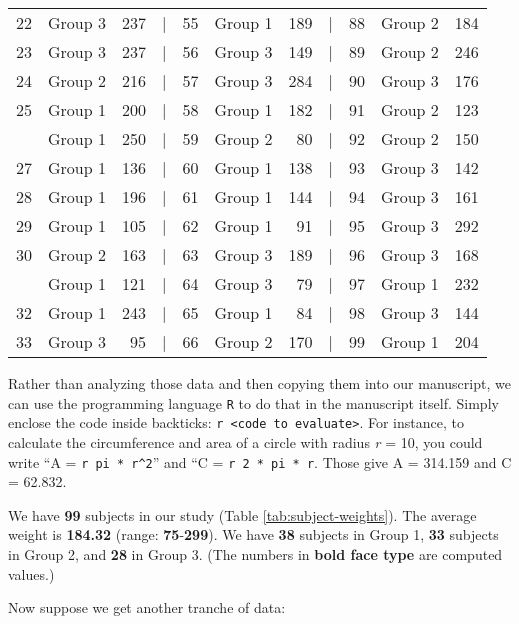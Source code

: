 \documentclass[smallextended]{svjour3}       %
\begin{document}
\begin{table}
\begin{tabular}[t]{rlrlrlrlrlr}
22 & Group 3 & 237 & | & 55 & Group 1 & 189 & | & 88 & Group 2 & 184\\
23 & Group 3 & 237 & | & 56 & Group 3 & 149 & | & 89 & Group 2 & 246\\
24 & Group 2 & 216 & | & 57 & Group 3 & 284 & | & 90 & Group 3 & 176\\
25 & Group 1 & 200 & | & 58 & Group 1 & 182 & | & 91 & Group 2 & 123\\
\addlinespace
26 & Group 1 & 250 & | & 59 & Group 2 & 80 & | & 92 & Group 2 & 150\\
27 & Group 1 & 136 & | & 60 & Group 1 & 138 & | & 93 & Group 3 & 142\\
28 & Group 1 & 196 & | & 61 & Group 1 & 144 & | & 94 & Group 3 & 161\\
29 & Group 1 & 105 & | & 62 & Group 1 & 91 & | & 95 & Group 3 & 292\\
30 & Group 2 & 163 & | & 63 & Group 3 & 189 & | & 96 & Group 3 & 168\\
\addlinespace
31 & Group 1 & 121 & | & 64 & Group 3 & 79 & | & 97 & Group 1 & 232\\
32 & Group 1 & 243 & | & 65 & Group 1 & 84 & | & 98 & Group 3 & 144\\
33 & Group 3 & 95 & | & 66 & Group 2 & 170 & | & 99 & Group 1 & 204\\
\bottomrule
\end{tabular}
\end{table}

Rather than analyzing those data and then copying them into our manuscript, we can use the programming language \texttt{R} to do that in the manuscript itself. Simply enclose the code inside backticks: \texttt{\textasciigrave{}r\ \textless{}code\ to\ evaluate\textgreater{}\textasciigrave{}}. For instance, to calculate the circumference and area of a circle with radius \emph{r} = 10, you could write ``A = \texttt{\textasciigrave{}r\ pi\ *\ r\^{}2\textasciigrave{}}'' and ``C = \texttt{\textasciigrave{}r\ 2\ *\ pi\ *\ r\textasciigrave{}}. Those give A = 314.159 and C = 62.832.

We have \textbf{99} subjects in our study (Table \ref{tab:subject-weights}). The average weight is \textbf{184.32} (range: \textbf{75}-\textbf{299}). We have \textbf{38} subjects in Group 1, \textbf{33} subjects in Group 2, and \textbf{28} in Group 3. (The numbers in \textbf{bold face type} are computed values.)

Now suppose we get another tranche of data:
\end{document}
